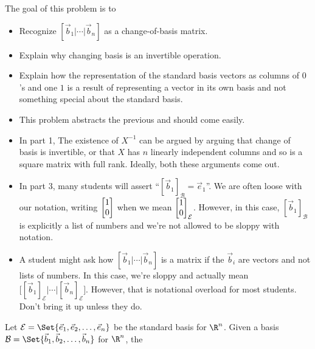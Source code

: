 	\begin{annotation}
		\begin{goals}

			The goal of this problem is to
			\begin{itemize}
				\item Recognize $[\vec b_1|\cdots|\vec b_n]$ as a change-of-basis matrix.
				\item Explain why changing basis is an invertible operation.
				\item Explain how the representation of the standard basis vectors as columns
					of $0$'s and one $1$ is a result of representing a vector in its own
					basis and not something special about the standard basis.
			\end{itemize}
		\end{goals}

		\begin{notes}
			\begin{itemize}
				\item This problem abstracts the previous and should come easily.
				\item In part 1, The existence of $X^{-1}$ can be argued by arguing that change of basis
					is invertible, or that $X$ has $n$ linearly independent columns and
					so is a square matrix with full rank. Ideally, both these arguments come out.
				\item In part 3, many students will assert ``$[\vec b_1]_{\mathcal B}=\vec e_1$''.
					We are often loose with our notation, writing $\mat{1\\0}$
					when we mean $\mat{1\\0}_{\mathcal E}$. However, in this case,
					$[\vec b_1]_{\mathcal B}$ is explicitly a list of numbers and we're
					not allowed to be sloppy with notation.
				\item A student might ask how $[\vec b_1|\cdots|\vec b_n]$ is a matrix if the $\vec b_i$
					are vectors and not lists of numbers. In this case, we're sloppy and actually
					mean $\Big[[\vec b_1]_{\mathcal E}|\cdots|[\vec b_n]_{\mathcal E}\Big]$. However, that is
					notational overload for most students. Don't bring it up unless they do.
			\end{itemize}
		\end{notes}
	\end{annotation}
	Let $\mathcal E=\Set{\vec e_1,\vec e_2,\ldots,\vec e_n}$ be the standard basis for $\R^n$.
	Given a basis $\mathcal B=\Set{\vec b_1,\vec b_2,\ldots,\vec b_n}$ for $\R^n$, the
